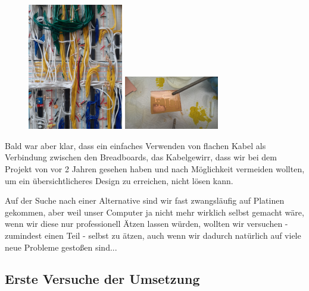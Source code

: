 \documentclass{scrartcl}
\begin{document}
        \begin{figure}
        \vspace{-40pt}
        \begin{center}
        \includegraphics[width=0.37\textwidth]{Computer_V01_Chaos_07}
        \includegraphics[width=0.37\textwidth,angle=0]{Handy/WP_20210704_20_54_21_Pro}
        \end{center}
        \vspace{-30pt}
        \end{figure}

    Bald war aber klar, dass ein einfaches Verwenden von flachen Kabel als Verbindung zwischen den Breadboards, das Kabelgewirr, dass wir bei dem Projekt von vor 2 Jahren gesehen haben
    und nach Möglichkeit vermeiden wollten, um ein übersichtlicheres Design zu erreichen, nicht lösen kann.

    Auf der Suche nach einer Alternative sind wir fast zwangsläufig auf Platinen gekommen, aber weil unser Computer ja nicht mehr wirklich selbst gemacht wäre, wenn wir diese nur professionell Ätzen lassen würden,
    wollten wir versuchen - zumindest einen Teil - selbst zu ätzen, auch wenn wir dadurch natürlich auf viele neue Probleme gestoßen sind...


    \newpage

    \subsection{Erste Versuche der Umsetzung}
\end{document}
